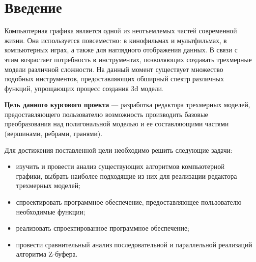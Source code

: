 \chapter*{Введение}

Компьютерная графика является одной из неотъемлемых частей современной жизни. Она используется повсеместно: в кинофильмах и мультфильмах, в компьютерных играх, а также для наглядного отображения данных.
В связи с этим возрастает потребность в инструментах, позволяющих создавать трехмерные модели различной сложности. На данный момент существует множество подобных инструментов, предоставляющих обширный спектр различных функций, упрощающих процесс создания 3d модели. 

\textbf{Цель данного курсового проекта} --- разработка редактора трехмерных моделей, предоставляющего пользователю возможность производить базовые преобразования над полигональной моделью и ее составляющими частями (вершинами, ребрами, гранями).

Для достижения поставленной цели необходимо решить следующие задачи:
\begin{itemize}[label=---]
	\item изучить и провести анализ существующих алгоритмов компьютерной графики, выбрать наиболее подходящие из них для реализации редактора трехмерных моделей;
	\item спроектировать программное обеспечение, предоставляющее пользователю необходимые функции;
	\item реализовать спроектированное программное обеспечение;
	\item провести сравнительный анализ последовательной и параллельной реализаций алгоритма Z-буфера.
\end{itemize}
